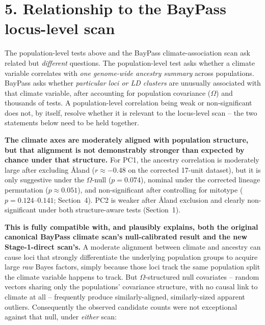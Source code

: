 \documentclass[11pt]{article}
\begin{document}
\clearpage
\section*{\color{Accent}5. Relationship to the BayPass locus-level scan}

The population-level tests above and the BayPass climate-association scan ask related but
\emph{different} questions. The population-level test asks whether a climate variable
correlates with \emph{one genome-wide ancestry summary} across populations. BayPass asks
whether \emph{particular loci or LD clusters} are unusually associated with that climate
variable, after accounting for population covariance ($\Omega$) and thousands of tests. A
population-level correlation being weak or non-significant does not, by itself, resolve
whether it is relevant to the locus-level scan -- the two statements below need to be held
together.

\textbf{The climate axes are moderately aligned with population structure, but that
alignment is not demonstrably stronger than expected by chance under that structure.} For
PC1, the ancestry correlation is moderately large after excluding \AA land ($r\approx-0.48$
on the corrected 17-unit dataset), but it is only suggestive under the $\Omega$-null
($p=0.074$), nominal under the corrected lineage permutation ($p\approx0.051$), and
non-significant after controlling for mitotype ($p=0.124$--$0.141$; Section~4). PC2 is
weaker after \AA land exclusion and clearly non-significant under both structure-aware
tests (Section~1).

\textbf{This is fully compatible with, and plausibly explains, both the original canonical
BayPass climate scan's null-calibrated result and the new Stage-1-direct scan's.} A
moderate alignment between climate and ancestry can cause loci that strongly differentiate
the underlying population groups to acquire large \emph{raw} Bayes factors, simply because
those loci track the same population split the climate variable happens to track. But
$\Omega$-structured null covariates -- random vectors sharing only the populations'
covariance structure, with no causal link to climate at all -- frequently produce
similarly-aligned, similarly-sized apparent outliers. Consequently the observed candidate
counts were not exceptional against that null, under \emph{either} scan:
\end{document}
